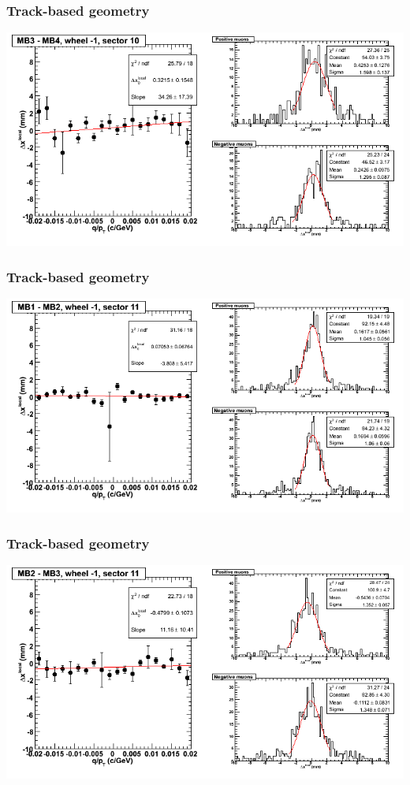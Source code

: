 \documentclass[compress]{beamer}
\begin{document}
\begin{frame}
\frametitle{Track-based geometry}
\includegraphics[width=\linewidth]{NOV4_segdiffs/dt13_resid_B_10_34.png}
\end{frame}

\begin{frame}
\frametitle{Track-based geometry}
\includegraphics[width=\linewidth]{NOV4_segdiffs/dt13_resid_B_11_12.png}
\end{frame}

\begin{frame}
\frametitle{Track-based geometry}
\includegraphics[width=\linewidth]{NOV4_segdiffs/dt13_resid_B_11_23.png}
\end{frame}
\end{document}
